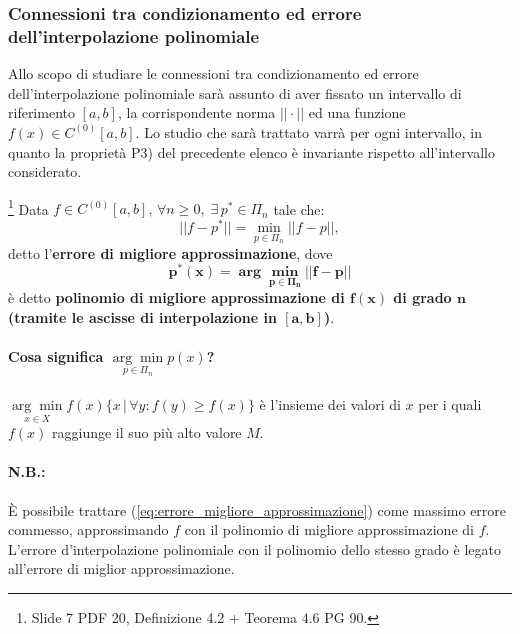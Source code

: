 \subsubsection{Connessioni tra condizionamento ed errore dell'interpolazione polinomiale}
\footnotemark Allo scopo di studiare le connessioni tra condizionamento ed errore dell'interpolazione polinomiale sarà assunto di aver fissato un intervallo di riferimento $[a,b]$, la corrispondente norma $||\cdot||$ ed una funzione $f(x)\in C^{(0)}[a,b]$. Lo studio che sarà trattato varrà per ogni intervallo, in quanto la proprietà P3) del precedente elenco è invariante rispetto all'intervallo considerato.

\begin{definition}\label{def:errore_polinomio_migliore_approssimazione}\footnote{Slide 7 PDF 20, Definizione 4.2 + Teorema 4.6 PG 90.}
    Data $f\in C^{(0)}[a,b],\,\forall n\geq 0,\;\exists\, p^*\in\Pi_n$ tale che:
    \begin{equation}\label{eq:errore_migliore_approssimazione}
        ||f-p^*||=\underset{p\in\Pi_n}{\min}||f-p||,
    \end{equation}
    detto l'\textbf{errore di migliore approssimazione}, dove
    \begin{equation*}
    	\boldsymbol{p^*(x) = \arg\underset{p\in\Pi_n}{\min}||f-p||}
    \end{equation*}
    è detto \textbf{polinomio di migliore approssimazione di $\boldsymbol{f(x)}$ di grado $\boldsymbol n$ (tramite le ascisse di interpolazione in $\boldsymbol{[a,b]}$)}.
\end{definition}

\paragraph{Cosa significa $\underset{p\in \Pi_n}{\arg\min}p(x)$?} $\underset{x\in X}{\arg\min}f(x)\{x\,|\,\forall y : f(y)\geq f(x)\}$ è l'insieme dei valori di $x$ per i quali $f(x)$ raggiunge il suo più alto valore $M$.

\paragraph{N.B.:} È possibile trattare (\ref{eq:errore_migliore_approssimazione}) come massimo errore commesso, approssimando $f$ con il polinomio di migliore approssimazione di $f$. L'errore d'interpolazione polinomiale con il polinomio dello stesso grado è legato all'errore di miglior approssimazione.

